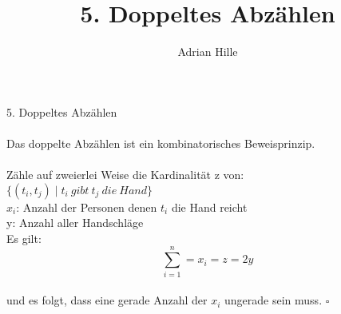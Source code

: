 \documentclass{scrartcl}\usepackage[utf8]{inputenc}
\title{5. Doppeltes Abz\"ahlen}
\author{Adrian Hille}
\begin{document}
\Large 5. Doppeltes Abz\"ahlen\\
\\
\normalsize
Das doppelte Abz\"ahlen ist ein kombinatorisches Beweisprinzip.\\
\\
Z\"ahle auf zweierlei Weise die Kardinalit\"at z von:\\
$\{(t_i , t_j) \mid t_i~gibt~ t_j~ die~ Hand\}$\\
$x_i$: Anzahl der Personen denen $t_i$ die Hand reicht\\
y: Anzahl aller Handschl\"age\\
Es gilt: \[ \sum_{i=1}^n = x_i=z=2y \]\\
und es folgt, dass eine gerade Anzahl der $x_i$ ungerade sein muss. $\square$ \\
\end{document}
